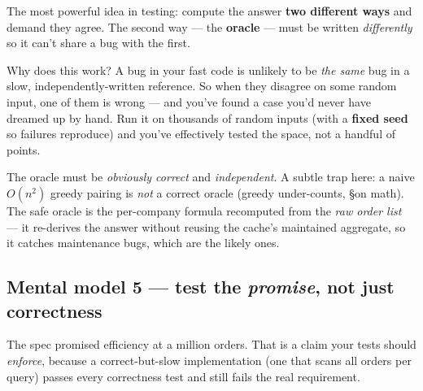 The most powerful idea in testing: compute the answer \textbf{two different ways}
and demand they agree. The second way --- the \textbf{oracle} --- must be written
\emph{differently} so it can't share a bug with the first.

\begin{center}
\end{center}

\begin{intu}
Why does this work? A bug in your fast code is unlikely to be \emph{the same} bug
in a slow, independently-written reference. So when they disagree on some random
input, one of them is wrong --- and you've found a case you'd never have dreamed up
by hand. Run it on thousands of random inputs (with a \textbf{fixed seed} so
failures reproduce) and you've effectively tested the space, not a handful of
points.
\end{intu}

\begin{pitfall}
The oracle must be \emph{obviously correct} and \emph{independent}. A subtle trap
here: a naive $O(n^2)$ greedy pairing is \emph{not} a correct oracle (greedy
under-counts, \S on math). The safe oracle is the per-company formula recomputed
from the \emph{raw order list} --- it re-derives the answer without reusing the
cache's maintained aggregate, so it catches maintenance bugs, which are the likely
ones.
\end{pitfall}

\subsection{Mental model 5 --- test the \emph{promise}, not just correctness}

The spec promised efficiency at a million orders. That is a claim your tests should
\emph{enforce}, because a correct-but-slow implementation (one that scans all orders
per query) passes every correctness test and still fails the real requirement.

